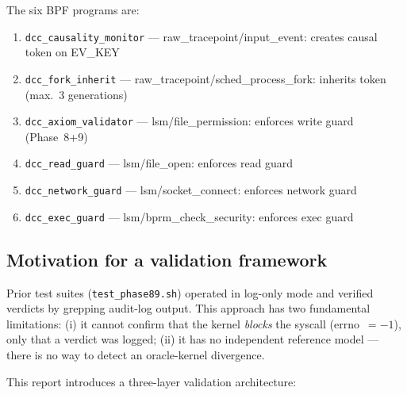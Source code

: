 \documentclass[11pt,a4paper]{article}
\theoremstyle{definition}
\begin{document}
The six BPF programs are:
\begin{enumerate}[noitemsep]
  \item \texttt{dcc\_causality\_monitor} — raw\_tracepoint/input\_event: creates causal token on EV\_KEY
  \item \texttt{dcc\_fork\_inherit} — raw\_tracepoint/sched\_process\_fork: inherits token (max.\ 3 generations)
  \item \texttt{dcc\_axiom\_validator} — lsm/file\_permission: enforces write guard (Phase~8+9)
  \item \texttt{dcc\_read\_guard} — lsm/file\_open: enforces read guard
  \item \texttt{dcc\_network\_guard} — lsm/socket\_connect: enforces network guard
  \item \texttt{dcc\_exec\_guard} — lsm/bprm\_check\_security: enforces exec guard
\end{enumerate}

\subsection{Motivation for a validation framework}

Prior test suites (\texttt{test\_phase89.sh}) operated in log-only mode and
verified verdicts by grepping audit-log output. This approach has two
fundamental limitations: (i) it cannot confirm that the kernel \emph{blocks}
the syscall (errno~$= -1$), only that a verdict was logged; (ii) it has no
independent reference model — there is no way to detect an oracle-kernel
divergence.

This report introduces a three-layer validation architecture:

\begin{center}
\end{center}
\end{document}
